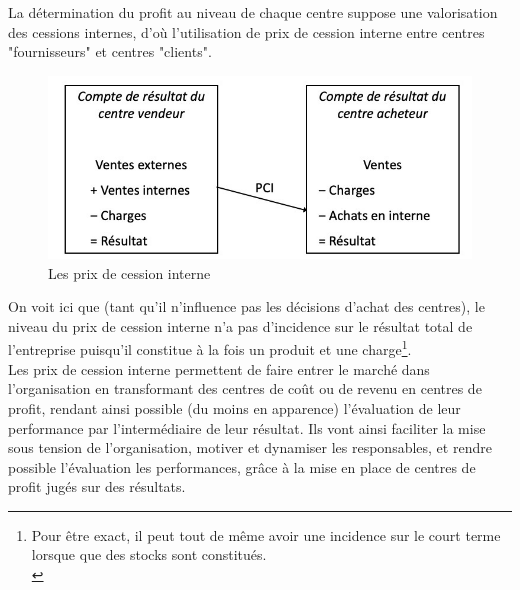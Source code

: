 \documentclass{kaobook}
\begin{document}
La détermination du profit au niveau de chaque centre suppose une valorisation des cessions internes, d’où l’utilisation de prix de cession interne entre centres "fournisseurs" et centres "clients".\\
\begin{figure}[htbp]
\centering
\includegraphics[width=.9\linewidth]{./img/pciresult.jpeg}
\caption{Les prix de cession interne}
\end{figure}
On voit ici que (tant qu’il n’influence pas les décisions d’achat des centres), le niveau du prix de cession interne n’a pas d’incidence sur le résultat total de l’entreprise puisqu’il constitue à la fois un produit et une charge\footnote{Pour être exact, il peut tout de même avoir une incidence sur le court terme lorsque que des stocks sont constitués.\\}.\\

Les prix de cession interne permettent de faire entrer le marché dans l’organisation en transformant des centres de coût ou de revenu en centres de profit, rendant ainsi possible (du moins en apparence) l’évaluation de leur performance par l’intermédiaire de leur résultat. Ils vont ainsi faciliter la mise sous tension de l’organisation, motiver et dynamiser les responsables, et rendre possible l’évaluation les performances, grâce à la mise en place de centres de profit jugés sur des résultats.\\
\end{document}
